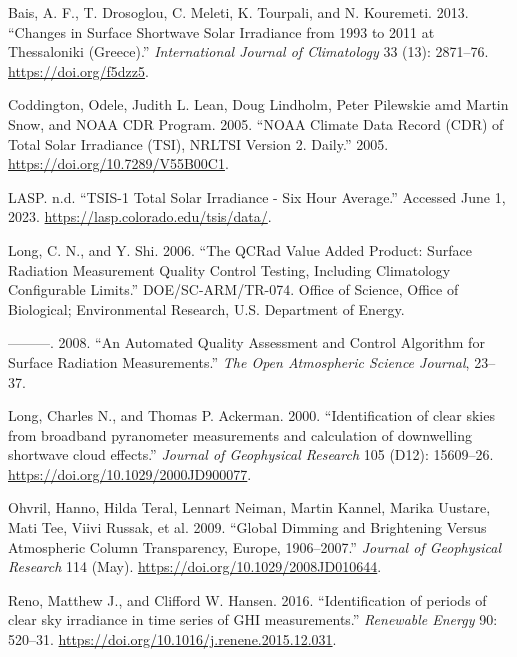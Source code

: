 \documentclass[
  preprint, 3p, authoryear]{article}
\newlength{\cslhangindent}
\newlength{\cslentryspacingunit} %
\newenvironment{CSLReferences}[2] %
 {%
  \setlength{\parindent}{0pt}
  \ifodd #1
  \let\oldpar\par
  \def\par{\hangindent=\cslhangindent\oldpar}
  \fi
  \setlength{\parskip}{#2\cslentryspacingunit}
 }%
 {}
\begin{document}
\hypertarget{refs}{}
\begin{CSLReferences}{1}{0}
\leavevmode{}%
Bais, A. F., T. Drosoglou, C. Meleti, K. Tourpali, and N. Kouremeti. 2013. {``Changes in Surface Shortwave Solar Irradiance from 1993 to 2011 at Thessaloniki (Greece).''} \emph{International Journal of Climatology} 33 (13): 2871--76. \url{https://doi.org/f5dzz5}.

\leavevmode{}%
Coddington, Odele, Judith L. Lean, Doug Lindholm, Peter Pilewskie amd Martin Snow, and NOAA CDR Program. 2005. {``{NOAA} Climate Data Record ({CDR}) of Total Solar Irradiance ({TSI}), {NRLTSI} Version 2. {D}aily.''} 2005. \url{https://doi.org/10.7289/V55B00C1}.

\leavevmode{}%
LASP. n.d. {``{TSIS-1} Total Solar Irradiance - Six Hour Average.''} Accessed June 1, 2023. \url{https://lasp.colorado.edu/tsis/data/}.

\leavevmode{}%
Long, C. N., and Y. Shi. 2006. {``The QCRad Value Added Product: Surface Radiation Measurement Quality Control Testing, Including Climatology Configurable Limits.''} DOE/SC-ARM/TR-074. Office of Science, Office of Biological; Environmental Research, U.S. Department of Energy.

\leavevmode{}%
---------. 2008. {``An {Automated} {Quality} {Assessment} and {Control} {Algorithm} for {Surface} {Radiation} {Measurements}.''} \emph{The Open Atmospheric Science Journal}, 23--37.

\leavevmode{}%
Long, Charles N., and Thomas P. Ackerman. 2000. {``{Identification of clear skies from broadband pyranometer measurements and calculation of downwelling shortwave cloud effects}.''} \emph{Journal of Geophysical Research} 105 (D12): 15609--26. \url{https://doi.org/10.1029/2000JD900077}.

\leavevmode{}%
Ohvril, Hanno, Hilda Teral, Lennart Neiman, Martin Kannel, Marika Uustare, Mati Tee, Viivi Russak, et al. 2009. {``Global Dimming and Brightening Versus Atmospheric Column Transparency, Europe, 1906--2007.''} \emph{Journal of Geophysical Research} 114 (May). \url{https://doi.org/10.1029/2008JD010644}.

\leavevmode{}%
Reno, Matthew J., and Clifford W. Hansen. 2016. {``{Identification of periods of clear sky irradiance in time series of GHI measurements}.''} \emph{Renewable Energy} 90: 520--31. \url{https://doi.org/10.1016/j.renene.2015.12.031}.


\end{CSLReferences}
\end{document}
